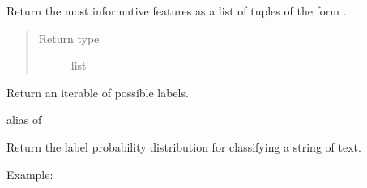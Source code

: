 \documentclass[letterpaper,10pt,english]{sphinxmanual}
\begin{document}
\begin{fulllineitems}
\begin{fulllineitems}
\label{api_reference:textblob.classifiers.NaiveBayesClassifier.informative_features}
Return the most informative features as a list of tuples of the
form .
\begin{quote}\begin{description}
\item[{Return type}] \leavevmode
list

\end{description}\end{quote}

\end{fulllineitems}


\begin{fulllineitems}
\label{api_reference:textblob.classifiers.NaiveBayesClassifier.labels}
Return an iterable of possible labels.

\end{fulllineitems}


\begin{fulllineitems}
\label{api_reference:textblob.classifiers.NaiveBayesClassifier.nltk_class}
alias of {\hyperref[api_reference:textblob.classifiers.NaiveBayesClassifier]{}}

\end{fulllineitems}


\begin{fulllineitems}
\label{api_reference:textblob.classifiers.NaiveBayesClassifier.prob_classify}
Return the label probability distribution for classifying a string
of text.

Example:


\end{fulllineitems}
\end{fulllineitems}
\end{document}
